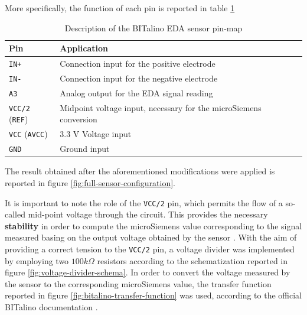 More specifically, the function of each pin is reported in table \ref{toc:bitalino-pinmap-table}

\begin{table}[H]
\centering
\begin{tabular}{ll}
    \hline
    \textbf{Pin}                    & \textbf{Application} \\
    \hline
    \texttt{IN+}                    & Connection input for the positive electrode \\
    \texttt{IN-}                    & Connection input for the negative electrode \\
    \texttt{A3}                     & Analog output for the EDA signal reading \\
    \texttt{VCC/2} (\texttt{REF})   & Midpoint voltage input, necessary for the microSiemens conversion \\
    \texttt{VCC} (\texttt{AVCC})    & 3.3 V Voltage input \\
    \texttt{GND}                    & Ground input \\
    \hline
\end{tabular}
\caption{Description of the BITalino EDA sensor pin-map}
\label{toc:bitalino-pinmap-table}
\end{table}

\vspace{1cm}

The result obtained after the aforementioned modifications were applied is reported in figure \ref{fig:full-sensor-configuration}. 

It is important to note the role of the \texttt{VCC/2} pin, which permits the flow of a so-called mid-point voltage through the circuit. This provides the necessary \textbf{stability} in order to compute the microSiemens value corresponding to the signal measured basing on the output voltage obtained by the sensor \cite{bitalino-midpoint-voltage}. With the aim of providing a correct tension to the \texttt{VCC/2} pin, a voltage divider was implemented by employing two $100 k\Omega$ resistors according to the schematization reported in figure \ref{fig:voltage-divider-schema}. In order to convert the voltage measured by the sensor to the corresponding microSiemens value, the transfer function reported in figure \ref{fig:bitalino-transfer-function} was used, according to the official BITalino documentation \cite{bitalino-general}.

